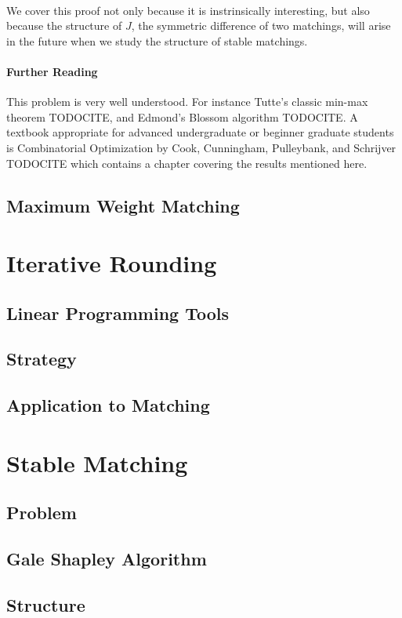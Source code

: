 \paragraph{}
We cover this proof not only because it is instrinsically interesting, but also because the structure of $J$, the symmetric difference of two matchings, will arise in the future when we study the structure of stable matchings.
\paragraph{Further Reading}
This problem is very well understood. For instance Tutte's classic min-max theorem TODOCITE, and Edmond's Blossom algorithm TODOCITE. A textbook appropriate for advanced undergraduate or beginner graduate students is Combinatorial Optimization by Cook, Cunningham, Pulleybank, and Schrijver TODOCITE which contains a chapter covering the results mentioned here.
\subsection{Maximum Weight Matching}
\section{Iterative Rounding}
\subsection{Linear Programming Tools}
\subsection{Strategy}
\subsection{Application to Matching}
\section{Stable Matching}
\subsection{Problem}
\subsection{Gale Shapley Algorithm}
\subsection{Structure}

